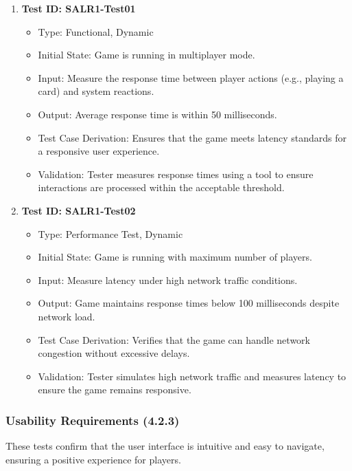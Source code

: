 \documentclass[12pt, titlepage]{article}
\begin{document}
\begin{enumerate}
    \item \textbf{Test ID: SALR1-Test01}
        \begin{itemize}
            \item Type: Functional, Dynamic
            \item Initial State: Game is running in multiplayer mode.
            \item Input: Measure the response time between player actions (e.g., playing a card) and system reactions.
            \item Output: Average response time is within 50 milliseconds.
            \item Test Case Derivation: Ensures that the game meets latency standards for a responsive user experience.
            \item Validation: Tester measures response times using a tool to ensure interactions are processed within the acceptable threshold.
        \end{itemize}

    \item \textbf{Test ID: SALR1-Test02}
        \begin{itemize}
            \item Type: Performance Test, Dynamic
            \item Initial State: Game is running with maximum number of players.
            \item Input: Measure latency under high network traffic conditions.
            \item Output: Game maintains response times below 100 milliseconds despite network load.
            \item Test Case Derivation: Verifies that the game can handle network congestion without excessive delays.
            \item Validation: Tester simulates high network traffic and measures latency to ensure the game remains responsive.
        \end{itemize}
\end{enumerate}

\subsubsection{Usability Requirements (4.2.3)}

These tests confirm that the user interface is intuitive and easy to navigate, ensuring a positive experience for players.
\end{document}
